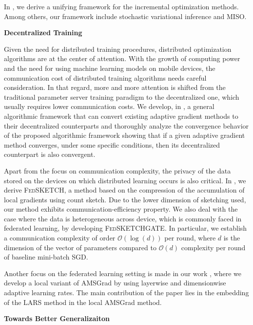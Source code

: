 \documentclass[twoside,11pt]{article}
\begin{document}
In \citep{karimi2019misso}, we derive a unifying framework for the incremental optimization methods. 
Among others, our framework include stochastic variational inference and MISO.



\vspace{0.15in}
\textbf{Decentralized Training} 
\vspace{0.08in}


Given the need for distributed training procedures, distributed optimization algorithms are at the center of attention. 
With the growth of computing power and the need for using machine learning models on mobile devices, the communication cost of distributed training algorithms needs careful consideration. 
In that regard, more and more attention is shifted from the traditional parameter server training paradigm to the decentralized one, which usually requires lower communication costs.
We develop, in \citep{chen2020decent}, a general algorithmic framework that can convert existing adaptive gradient methods to their decentralized counterparts and thoroughly analyze the convergence behavior of the proposed algorithmic framework showing that if a given adaptive gradient method converges, under some specific conditions, then its decentralized counterpart is also convergent.

Apart from the focus on communication complexity, the privacy of the data stored on the devices on which distributed learning occurs is also critical.
In \citep{had2020}, we derive \textsc{FedSKETCH}, a method based on the compression of the accumulation of local gradients using count sketch.
Due to the lower dimension of sketching used, our method exhibits communication-efficiency property. We also deal with the case where the data is heterogeneous across device, which is commonly faced in federated learning, by developing \textsc{FedSKETCHGATE}.
In particular, we establish a communication complexity of order $\mathcal{O}(\log(d))$ per round, where $d$ is the dimension of the vector of parameters compared to $\mathcal{O}(d)$ complexity per round of baseline mini-batch SGD.

Another focus on the federated learning setting is made in our work \citep{karimi2020lars}, where we develop a local variant of AMSGrad by using layerwise and dimensionwise adaptive learning rates. The main contribution of the paper lies in the embedding of the LARS method in the local AMSGrad method.


\vspace{0.15in}
\textbf{Towards Better Generalizaiton} 
\vspace{0.08in}
\end{document}
